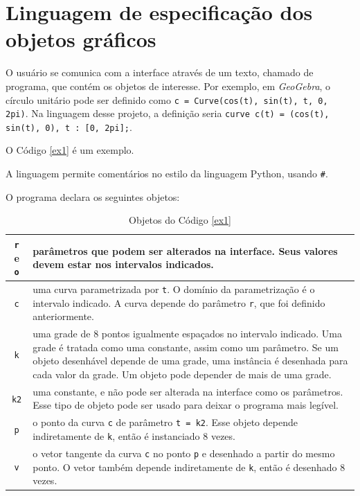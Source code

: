 \chapter{Linguagem de especificação dos objetos gráficos}
\label{lang}

O usuário se comunica com a interface através de um texto, chamado de programa,
que contém os objetos de interesse. 
Por exemplo, em \textit{GeoGebra}, o círculo unitário pode ser
definido como
\texttt{c = Curve(cos(t), sin(t), t, 0, 2pi)}.
Na linguagem desse projeto, a definição seria
\texttt{curve c(t) = (cos(t), sin(t), 0), t : [0, 2pi];}.

O Código \ref{ex1} é um exemplo.

A linguagem permite comentários no estilo da linguagem Python, usando \texttt{\#}.

O programa declara os seguintes objetos:

\begin{table}[ht]
\caption{Objetos do Código \ref{ex1}}
\label{objtypes}
\begin{centering}
\begin{tabularx}{\textwidth}{||c|X||}
    \hline
    \texttt{r} e \texttt{o} & parâmetros que podem ser alterados na interface.
    Seus valores devem estar nos intervalos indicados. \\ 

    \hline
    \texttt{c} & uma curva parametrizada por \texttt{t}.
    O domínio da parametrização é o intervalo indicado.
    A curva depende do parâmetro \texttt{r}, que foi definido anteriormente. \\

    \hline
    \texttt{k} & uma grade de 8 pontos igualmente espaçados no intervalo indicado.
    Uma grade é tratada como uma constante, assim como um parâmetro.
    Se um objeto desenhável depende de uma grade, uma instância é desenhada para cada valor da grade.
    Um objeto pode depender de mais de uma grade. \\

    \hline
    \texttt{k2} & uma constante, e não pode ser alterada na interface como os parâmetros.
    Esse tipo de objeto pode ser usado para deixar o programa mais legível. \\
    
    \hline
    \texttt{p} & o ponto da curva \texttt{c} de parâmetro \texttt{t = k2}.
    Esse objeto depende indiretamente de \texttt{k}, então é instanciado 8 vezes. \\
    
    \hline
    \texttt{v} & o vetor tangente da curva \texttt{c} no ponto \texttt{p} 
    e desenhado a partir do mesmo ponto.
    O vetor também depende indiretamente de \texttt{k}, então é desenhado 8 vezes. \\
    \hline
\end{tabularx}
\end{centering}
\end{table}

